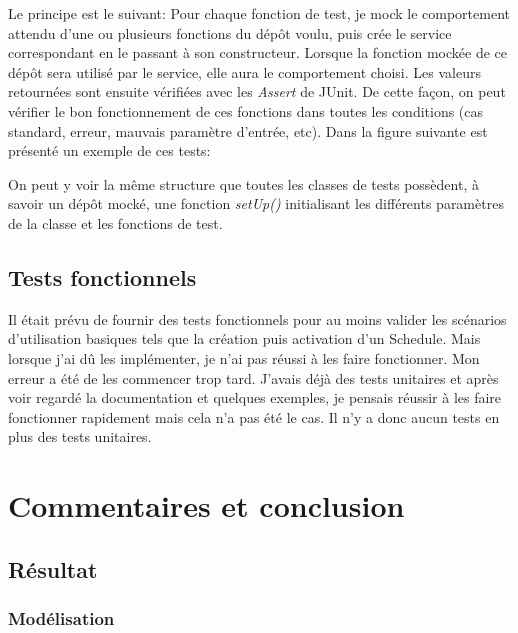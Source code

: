 \documentclass[french]{article}
\begin{document}
Le principe est le suivant:\newline
Pour chaque fonction de test, je mock le comportement attendu d'une ou plusieurs fonctions du dépôt voulu, puis crée le service correspondant en le passant à son constructeur. Lorsque la fonction mockée de ce dépôt sera utilisé par le service, elle aura le comportement choisi. Les valeurs retournées sont ensuite vérifiées avec les \textit{Assert} de JUnit. De cette façon, on peut vérifier le bon fonctionnement de ces fonctions dans toutes les conditions (cas standard, erreur, mauvais paramètre d'entrée, etc). \newline
Dans la figure suivante est présenté un exemple de ces tests:



On peut y voir la même structure que toutes les classes de tests possèdent, à savoir un dépôt mocké, une fonction \textit{setUp()} initialisant les différents paramètres de la classe et les fonctions de test.

\subsection{Tests fonctionnels}

Il était prévu de fournir des tests fonctionnels pour au moins valider les scénarios d'utilisation basiques tels que la création puis activation d'un Schedule. Mais lorsque j'ai dû les implémenter, je n'ai pas réussi à  les faire fonctionner. Mon erreur a été de les commencer trop tard. J'avais déjà des tests unitaires et après voir regardé la documentation et quelques exemples, je pensais réussir à les faire fonctionner rapidement mais cela n'a pas été le cas. \newline
Il n'y a donc aucun tests en plus des tests unitaires.

\newpage
\section{Commentaires et conclusion}

\subsection{Résultat}

\subsubsection{Modélisation}
\end{document}
